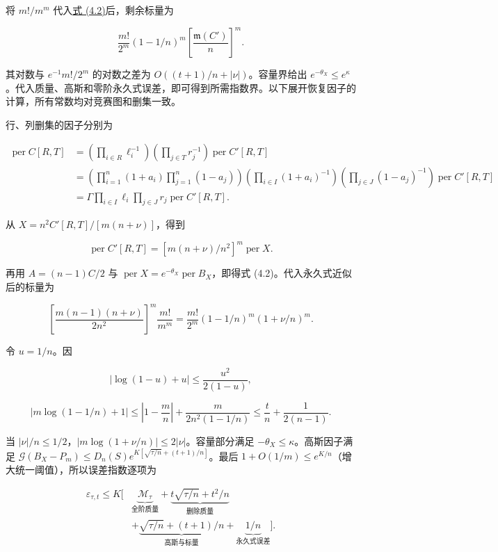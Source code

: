 \documentclass[11pt,a4paper]{article}
\begin{document}
将 \(m!/m^m\) 代入\hyperref[eq-exact-restoration]{式 (4.2)}后，剩余标量为

\[
\frac{m!}{2^m}(1-1/n)^m\left[\frac{\mathfrak m(C')}{n}\right]^m.
\]

其对数与 \(e^{-1}m!/2^m\) 的对数之差为 \(O((t+1)/n+|\nu|)\)。容量界给出 \(e^{-\theta_X}\le e^\kappa\)。代入质量、高斯和零阶永久式误差，即可得到所需指数界。以下展开恢复因子的计算，所有常数均对竞赛图和删集一致。

行、列删集的因子分别为

\[
\begin{aligned}
\operatorname{per}C[R,T]
&=\left(\prod_{i\in R}\ell_i^{-1}\right)
\left(\prod_{j\in T}r_j^{-1}\right)\operatorname{per}C'[R,T]\\
&=\left(\prod_{i=1}^n(1+a_i)\prod_{j=1}^n(1-a_j)\right)
\left(\prod_{i\in I}(1+a_i)^{-1}\right)
\left(\prod_{j\in J}(1-a_j)^{-1}\right)\operatorname{per}C'[R,T]\\
&=\Gamma\prod_{i\in I}\ell_i\prod_{j\in J}r_j\operatorname{per}C'[R,T].
\end{aligned}
\]

从 \(X=n^2C'[R,T]/[m(n+\nu)]\)，得到

\[
\operatorname{per}C'[R,T]=[m(n+\nu)/n^2]^m\operatorname{per}X.
\]

再用 \(A=(n-1)C/2\) 与 \(\operatorname{per}X=e^{-\theta_X}\operatorname{per}B_X\)，即得式 (4.2)。代入永久式近似后的标量为

\[
\left[\frac{m(n-1)(n+\nu)}{2n^2}\right]^m\frac{m!}{m^m}
=\frac{m!}{2^m}(1-1/n)^m(1+\nu/n)^m.
\]

令 \(u=1/n\)。因

\[
|\log(1-u)+u|\le\frac{u^2}{2(1-u)},
\]

\[
\left|m\log(1-1/n)+1\right|
\le\left|1-\frac mn\right|+\frac{m}{2n^2(1-1/n)}
\le\frac tn+\frac1{2(n-1)}.
\]

当 \(|\nu|/n\le1/2\)，\(|m\log(1+\nu/n)|\le2|\nu|\)。容量部分满足 \(-\theta_X\le\kappa\)。高斯因子满足 \(\mathcal G(B_X-P_m)\le D_n(S)e^{K[\sqrt{\tau/n}+(t+1)/n]}\)。最后 \(1+O(1/m)\le e^{K/n}\)（增大统一阈值），所以误差指数逐项为

\[
\begin{aligned}
\varepsilon_{\tau,t}\le K\bigg[&\underbrace{\mathcal M_\tau}_{\text{全阶质量}}
+\underbrace{t\sqrt{\tau/n}+t^2/n}_{\text{删除质量}}\\
&+\underbrace{\sqrt{\tau/n}+(t+1)/n}_{\text{高斯与标量}}
+\underbrace{1/n}_{\text{永久式误差}}\bigg].
\end{aligned}
\]
\end{document}
